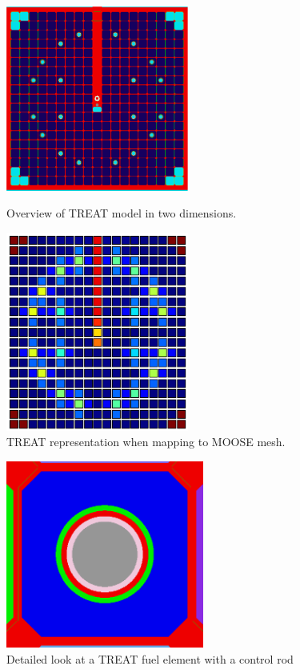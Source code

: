 \documentclass[11pt]{article}
\begin{document}
\begin{figure}
\centering
\begin{minipage}{.5\textwidth}
    \centering
    \includegraphics[width=6cm]{figures/treat_top_view.png}
    \caption{Overview of TREAT model in two dimensions.}
    \label{fig:treat2d}
\end{minipage}%
\begin{minipage}{.5\textwidth}
  \centering
  \includegraphics[width=6cm]{figures/simple-treat.png}
  \caption{TREAT representation when mapping to MOOSE mesh.}
  \label{fig:simpletreat}
\end{minipage}
\end{figure}

\begin{figure}
    \centering
    \includegraphics[width=6.5cm]{figures/treat-fuel-elem.png}
    \caption{Detailed look at a TREAT fuel element with a control rod}
    \label{fig:treat2d}
\end{figure}
\end{document}
